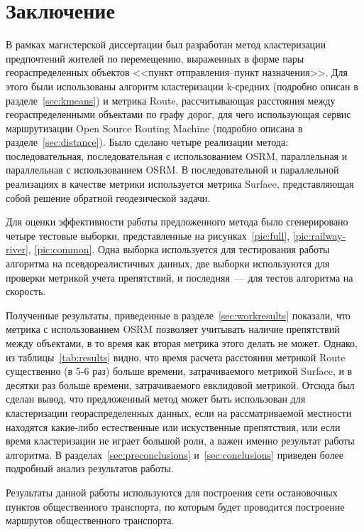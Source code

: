 \part{Заключение}
В рамках магистерской диссертации был разработан метод кластеризации предпочтений жителей по перемещению, выраженных в форме пары геораспределенных объектов <<пункт отправления--пункт назначения>>. Для этого были использованы алгоритм кластеризации k-средних (подробно описан в разделе~\ref{sec:kmeans}) и метрика Route, рассчитывающая расстояния между геораспределенными объектами по графу дорог, для чего использующая сервис маршрутизации Open Source Routing Machine (подробно описана в разделе~\ref{sec:distance}). Было сделано четыре реализации метода: последовательная, последовательная с использованием OSRM, параллельная и параллельная с использованием OSRM. В последовательной и параллельной реализациях в качестве метрики используется метрика Surface, представляющая собой решение обратной геодезической задачи.

Для оценки эффективности работы предложенного метода было сгенерировано четыре тестовые выборки, представленные на рисунках~\ref{pic:full}, \ref{pic:railway-river}, \ref{pic:common}. Одна выборка используется для тестирования работы алгоритма на псевдореалистичных данных, две выборки используются для проверки метрикой учета препятствий, и последняя~--- для тестов алгоритма на скорость.

Полученные результаты, приведенные в разделе~\ref{sec:workresults} показали, что метрика с использованием OSRM позволяет учитывать наличие препятствий между объектами, в то время как вторая метрика этого делать не может. Однако, из таблицы~\ref{tab:results} видно, что время расчета расстояния метрикой Route существенно (в 5-6 раз) больше времени, затрачиваемого метрикой Surface, и в десятки раз больше времени, затрачиваемого евклидовой метрикой. Отсюда был сделан вывод, что предложенный метод может быть использован для кластеризации геораспределенных данных, если на рассматриваемой местности находятся какие-либо естественные или искуственные препятствия, или если время кластеризации не играет большой роли, а важен именно результат работы алгоритма. В разделах~\ref{sec:preconclusions} и~\ref{sec:conclusions} приведен более подробный анализ результатов работы.

Результаты данной работы используются для построения сети остановочных пунктов общественного транспорта, по которым будет проводится построение маршрутов общественного транспорта.
